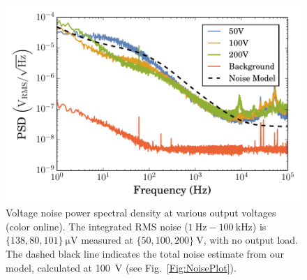 \documentclass[aip,rsi,reprint]{revtex4-1} %
\begin{document}
\begin{figure}[t]
\includegraphics[width=\columnwidth]{VoltagePSD}
\caption{Voltage noise power spectral density at various output voltages (color online). The integrated RMS noise ($\SI{1}{\hertz} - \SI{100}{\kilo\hertz}$) is $\{138, 80, 101\}~\si{\micro\volt}$ measured at  $\{50, 100, 200\}~\si{\volt}$, with no output load. The dashed black line indicates the total noise estimate from our model, calculated at \SI{100}{\volt} (see Fig.~\ref{Fig:NoisePlot}).\label{Fig:PSD}}
\end{figure}
\end{document}
